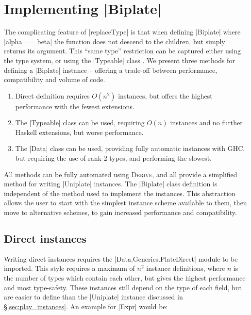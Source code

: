 \documentclass[preprint]{sigplanconf}
\let\cite=\citep
\newcommand{\derive}{\textsc{Derive}}
\newcommand{\ignore}{}
\begin{document}
\section{Implementing |Biplate|}
\label{sec:implement_playex}

The complicating feature of |replaceType| is that when defining |Biplate| where \ignore|alpha == beta| the function does not descend to the children, but simply returns its argument. This ``same type'' restriction can be captured either using the type system, or using the |Typeable| class \cite{lammel:syb}. We present three methods for defining a |Biplate| instance -- offering a trade-off between performance, compatibility and volume of code.

\begin{enumerate}
\item Direct definition requires $O(n^2)$ instances, but offers the highest performance with the fewest extensions.
\item The |Typeable| class can be used, requiring $O(n)$ instances and no further Haskell extensions, but worse performance.
\item The |Data| class can be used, providing fully automatic instances with GHC, but requiring the use of rank-2 types, and performing the slowest.
\end{enumerate}

All methods can be fully automated using \derive{}, and all provide a simplified method for writing |Uniplate| instances. The |Biplate| class definition is independent of the method used to implement the instances. This abstraction allows the user to start with the simplest instance scheme available to them, then move to alternative schemes, to gain increased performance and compatibility.

\subsection{Direct instances}
\label{sec:implement_playdirect}

Writing direct instances requires the |Data.Generics.PlateDirect| module to be imported. This style requires a maximum of $n^2$ instance definitions, where $n$ is the number of types which contain each other, but gives the highest performance and most type-safety. These instances still depend on the type of each field, but are easier to define than the |Uniplate| instance discussed in \S\ref{sec:play_instances}. An example for |Expr| would be:
\end{document}
